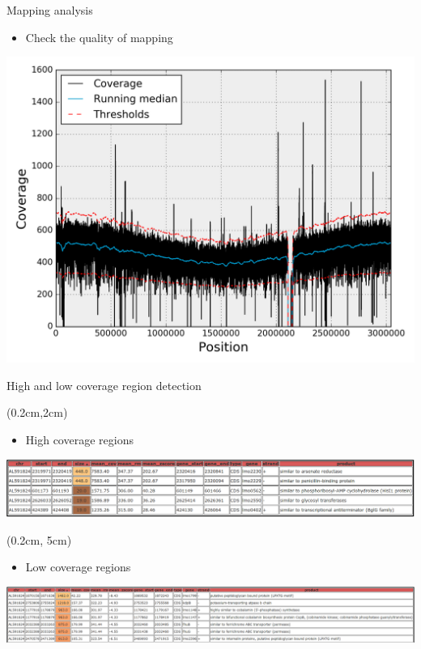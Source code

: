 \documentclass{beamer}
\begin{document}
\begin{frame}{Mapping analysis}
    \begin{itemize}
        \item Check the quality of mapping
    \end{itemize}
    \center
    \includegraphics[scale=0.4]{images/running_median}
\end{frame}

\begin{frame}{High and low coverage region detection}
    \begin{textblock*}{10cm}(0.2cm,2cm)
        \begin{itemize}
            \item High coverage regions
        \end{itemize}
        \includegraphics[scale=0.195]{images/high_roi}
    \end{textblock*}
    \begin{textblock*}{10cm}(0.2cm, 5cm)
        \begin{itemize}
            \item Low coverage regions
        \end{itemize}
        \includegraphics[scale=0.145]{images/low_roi}
    \end{textblock*}
\end{frame}
\end{document}
